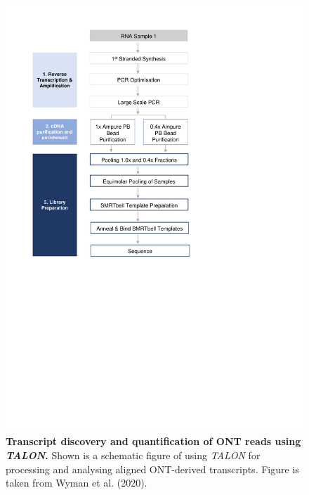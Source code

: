 \begin{figure}[htp]
	\centering
	\includegraphics[page=23,trim={0cm 11cm 0cm 2cm},clip,scale = 0.7]{Figures/ProjectDevelopment_Figures}
	\captionsetup{width=0.95\textwidth,singlelinecheck=off}
	\caption[Transcript discovery and quantification of ONT reads using \textit{TALON}]%
	{\textbf{Transcript discovery and quantification of ONT reads using \textit{TALON}.} Shown is a schematic figure of using \textit{TALON} for processing and analysing aligned ONT-derived transcripts. Figure is taken from Wyman et al. (2020)\cite{Wyman2019}.  
	}
	\label{fig:ONT_Talon}
\end{figure}